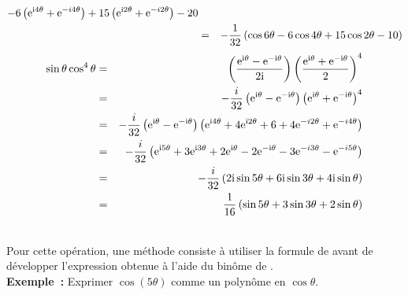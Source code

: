 \documentclass{magnoliaold}
\begin{document}
\begin{applications}
\begin{sol}
\begin{eqnarray*}
{                        -6\left({\rm e}^{{\rm i}4\theta}+{\rm e}^{-i4\theta}\right)
                        +15\left({\rm e}^{{\rm i}2\theta}+{\rm e}^{-i2\theta}\right)-20}\\
    &=& -\frac{1}{32}\left(\cos 6\theta-6\cos 4\theta+15\cos 2\theta-10\right)
    \end{eqnarray*}
    \begin{eqnarray*}
    \sin \theta \cos^4 \theta
    &=& \left(\frac{{\rm e}^{{\rm i}\theta}-{\rm e}^{-{\rm i}\theta}}{2{\rm i}}\right)
        \left(\frac{{\rm e}^{{\rm i}\theta}+{\rm e}^{-{\rm i}\theta}}{2}\right)^4\\
    &=& -\frac{i}{32}\left({\rm e}^{{\rm i}\theta}-{\rm e}^{-{\rm i}\theta}\right)
                     \left({\rm e}^{{\rm i}\theta}+{\rm e}^{-{\rm i}\theta}\right)^4\\
    &=& -\frac{i}{32}\left({\rm e}^{{\rm i}\theta}-{\rm e}^{-{\rm i}\theta}\right)
        \left({\rm e}^{{\rm i} 4\theta}+4{\rm e}^{{\rm i} 2\theta}+6+4{\rm e}^{-i2\theta}+{\rm e}^{-i4\theta}\right)\\
    &=& -\frac{i}{32}\left({\rm e}^{{\rm i} 5\theta}+3{\rm e}^{{\rm i} 3\theta}+2{\rm e}^{{\rm i}\theta}-2{\rm e}^{-{\rm i}\theta}
                        -3{\rm e}^{-i3\theta}-{\rm e}^{-i5\theta}\right)\\
    &=& -\frac{i}{32}\left(2{\rm i}\sin 5\theta+6{\rm i}\sin 3\theta+4{\rm i}\sin \theta\right)\\
    &=& \frac{1}{16}\left(\sin 5\theta+3\sin 3\theta+2\sin \theta\right)
    \end{eqnarray*}      
    \end{sol}
\\
  Pour cette opération, une méthode consiste à utiliser la formule de
   avant de développer l'expression obtenue à l'aide du binôme de
  .\\
  {\bf Exemple~:} Exprimer $\cos(5\theta)$ comme un polynôme en $\cos\theta$. 
\end{applications}
\end{document}
